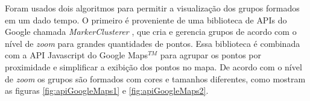 Foram usados dois algoritmos para permitir a visualização dos grupos formados em um dado tempo. O primeiro é proveniente de uma biblioteca de \acrshort{API}s do Google chamada \emph{MarkerClusterer} \cite{markerCluster}, que cria e gerencia grupos de acordo com o nível de \textit{zoom} para grandes quantidades de pontos. Essa biblioteca é combinada com a \acrshort{API} Javascript do Google Maps$^{TM}$ para agrupar os pontos por proximidade e simplificar a exibição dos pontos no mapa.
De acordo com o nível de \textit{zoom} os grupos são formados com cores e tamanhos diferentes, como mostram as figuras \ref{fig:apiGoogleMaps1} e \ref{fig:apiGoogleMaps2}.
\begin{figure}[!ht]
	\centering	
\end{figure}
\FloatBarrier

\begin{figure}[!ht]
	\centering	
\end{figure}
\FloatBarrier

